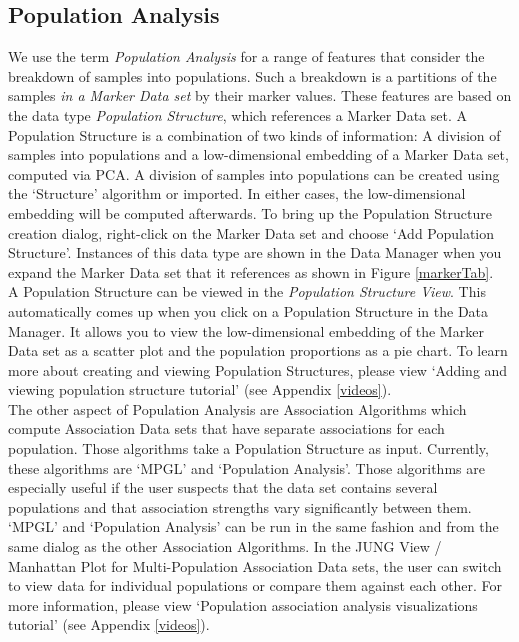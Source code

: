 \documentclass{article}
\begin{document}
\subsection{Population Analysis}

We use the term {\it Population Analysis} for a range of features that consider the breakdown of samples into populations. Such a breakdown is a partitions of the samples {\it in a Marker Data set} by their marker values. These features are based on the data type {\it Population Structure}, which references a Marker Data set. A Population Structure is a combination of two kinds of information: A division of samples into populations and a low-dimensional embedding of a Marker Data set, computed via PCA. A division of samples into populations can be created using the `Structure' algorithm or imported. In either cases, the low-dimensional embedding will be computed afterwards. To bring up the Population Structure creation dialog, right-click on the Marker Data set and choose `Add Population Structure'. Instances of this data type are shown in the Data Manager when you expand the Marker Data set that it references as shown in Figure \ref{markerTab}.\\

A Population Structure can be viewed in the {\it Population Structure View}. This automatically comes up when you click on a Population Structure in the Data Manager. It allows you to view the low-dimensional embedding of the Marker Data set as a scatter plot and the population proportions as a pie chart. To learn more about creating and viewing Population Structures, please view `Adding and viewing population structure tutorial' (see Appendix \ref{videos}).\\

The other aspect of Population Analysis are Association Algorithms which compute Association Data sets that have separate associations for each population. Those algorithms take a Population Structure as input. Currently, these algorithms are `MPGL' and `Population Analysis'. Those algorithms are especially useful if the user suspects that the data set contains several populations and that association strengths vary significantly between them. `MPGL' and `Population Analysis' can be run in the same fashion and from the same dialog as the other Association Algorithms. In the JUNG View / Manhattan Plot for Multi-Population Association Data sets, the user can switch to view data for individual populations or compare them against each other. For more information, please view `Population association analysis visualizations tutorial' (see Appendix \ref{videos}).
\end{document}
